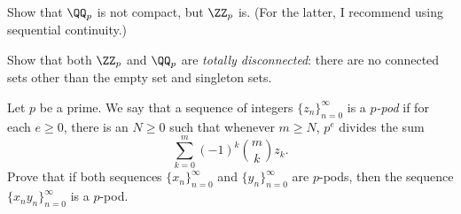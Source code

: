 \section{\problemhead}
\begin{dproblem}
	[$\ZZ_p$ is compact]
	Show that $\QQ_p$ is not compact, but $\ZZ_p$ is.
	(For the latter, I recommend using sequential continuity.)
\end{dproblem}
\begin{dproblem}
	Show that both $\ZZ_p$ and $\QQ_p$ are \emph{totally disconnected}:
	there are no connected sets other than the empty set and singleton sets.
\end{dproblem}

\begin{problem}
	Let $p$ be a prime.
	We say that a sequence of integers $\{z_n\}_{n=0}^\infty$
	is a \emph{$p$-pod} if for each $e \geq 0$,
	there is an $N \geq 0$ such that whenever $m \geq N$,
	$p^e$ divides the sum
	\[ \sum_{k=0}^m (-1)^k \binom mk z_k. \]
	Prove that if both sequences $\{x_n\}_{n=0}^\infty$
	and $\{y_n\}_{n=0}^\infty$ are $p$-pods,
	then the sequence $\{x_n y_n\}_{n=0}^\infty$ is a $p$-pod.
\end{problem}
